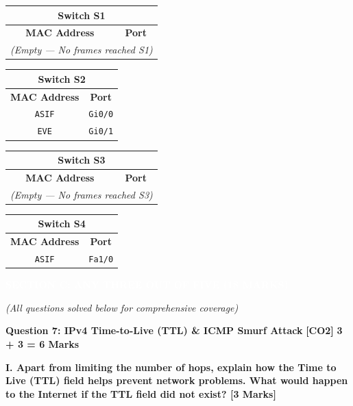 \documentclass[11pt,a4paper]{article}
\newcommand{\questionheader}[3]{
    \vspace{0.35cm}
    \noindent\colorbox{qboxbg}{
        \parbox{\dimexpr\textwidth-2\fboxsep\relax}{
            \textbf{\textcolor{primary}{\large #1}} \hfill \textbf{\textcolor{accent}{[#2]}} \hfill \textbf{\textcolor{secondary}{#3 Marks}}
        }
    }
    \vspace{0.15cm}
}
\newcommand{\sectionbanner}[1]{
    \vspace{0.5cm}
    \noindent\colorbox{primary}{
        \parbox{\dimexpr\textwidth-2\fboxsep\relax}{
            \centering \textbf{\textcolor{white}{\Large #1}}
        }
    }
    \vspace{0.25cm}
}
\begin{document}
\begin{center}
\begin{tabular}{|c|c|}
\multicolumn{2}{c}{\textbf{Switch S1}} \\
\hline
\textbf{MAC Address} & \textbf{Port} \\
\hline
\multicolumn{2}{|c|}{\textit{(Empty --- No frames reached S1)}} \\
\hline
\end{tabular}
\quad
\begin{tabular}{|c|c|}
\multicolumn{2}{c}{\textbf{Switch S2}} \\
\hline
\textbf{MAC Address} & \textbf{Port} \\
\hline
\texttt{ASIF} & \texttt{Gi0/0} \\
\texttt{EVE}  & \texttt{Gi0/1} \\
\hline
\end{tabular}
\quad
\begin{tabular}{|c|c|}
\multicolumn{2}{c}{\textbf{Switch S3}} \\
\hline
\textbf{MAC Address} & \textbf{Port} \\
\hline
\multicolumn{2}{|c|}{\textit{(Empty --- No frames reached S3)}} \\
\hline
\end{tabular}
\quad
\begin{tabular}{|c|c|}
\multicolumn{2}{c}{\textbf{Switch S4}} \\
\hline
\textbf{MAC Address} & \textbf{Port} \\
\hline
\texttt{ASIF} & \texttt{Fa1/0} \\
\hline
\end{tabular}
\end{center}

\newpage
\sectionbanner{SECTION C: ANY THREE OUT OF FIVE (18 MARKS)}
\textit{(All questions solved below for comprehensive coverage)}

\questionheader{Question 7: IPv4 Time-to-Live (TTL) \& ICMP Smurf Attack}{CO2}{3 + 3 = 6}

\textbf{I. Apart from limiting the number of hops, explain how the Time to Live (TTL) field helps prevent network problems. What would happen to the Internet if the TTL field did not exist? [3 Marks]}
\end{document}
